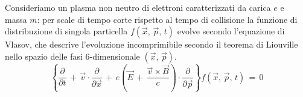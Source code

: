 Consideriamo un plasma non neutro di elettroni caratterizzati da carica $e$ e massa $m$: per scale di tempo corte rispetto
al tempo di collisione la funzione di distribuzione di singola particella $f\left(\vec{x},\,\vec{p},\,t\right)$ evolve secondo
l'equazione di Vlasov, che descrive l'evoluzione incomprimibile secondo il teorema di Liouville nello spazio delle fasi
6-dimensionale $\left(\vec{x},\,\vec{p}\right)$.
\begin{equation}
    \left\{\frac{\partial}{\partial t}\,+\,\vec{v}\cdot\frac{\partial}{\partial \vec{x}}\,+\,e\left(\vec{E}\,+\,\frac{\vec{v}\times\vec{B}}{c}\right)\cdot\frac{\partial}{\partial \vec{p}}\right\}f\left(\vec{x},\,\vec{p},\,t\right)\,=\,0
    \label{equation: VlasovEq}
\end{equation}
